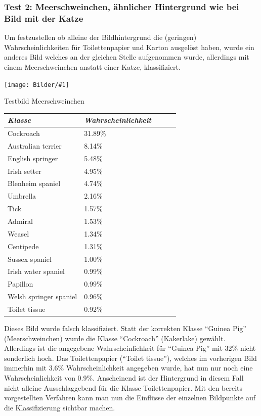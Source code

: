 \documentclass[
  12pt, %
  a4paper, %
  oneside, %
  openany, 
  numbers=noenddot, %
  BCOR=5mm, %
  parskip=half*, %
  thesis, %
]{bfhbook}
\newcommand{\imgText}[3]{
\begin{center}
    \begin{minipage}[t]{0.6\textwidth}
    		\vspace{0pt}
		\texttt{[image: Bilder/\#1]}
		\caption{#2}
	\end{minipage}\hfill
    \begin{minipage}[t]{0.4\textwidth}
    		\vspace{20pt}
  		#3
    \end{minipage}
\end{center}
}
\begin{document}
\subsubsection*{Test 2: Meerschweinchen, ähnlicher Hintergrund wie bei Bild mit der Katze}
Um festzustellen ob alleine der Bildhintergrund die (geringen) Wahrscheinlichkeiten für Toilettenpapier und Karton ausgelöst haben, wurde ein anderes Bild welches an der gleichen Stelle aufgenommen wurde, allerdings mit einem Meerschweinchen anstatt einer Katze, klassifiziert.
\imgText{IMG_2729.JPG}{Testbild Meerschweinchen}{

		\begin{tabular}{@{} *5l @{}}    \toprule
		\emph{Klasse} & \emph{Wahrscheinlichkeit} &&&  \\\midrule
		Cockroach & 31.89\% \\
		Australian terrier &  8.14\% \\
		English springer & 5.48\% \\
		Irish setter & 4.95\% \\
		Blenheim spaniel & 4.74\% \\
		Umbrella & 2.16\% \\
		Tick & 1.57\% \\
		Admiral & 1.53\% \\
		Weasel  & 1.34\% \\
		Centipede & 1.31\% \\
		Sussex spaniel & 1.00\% \\
		Irish water spaniel  & 0.99\% \\
		Papillon & 0.99\% \\
		Welsh springer spaniel  & 0.96\% \\
		Toilet tissue & 0.92\% \\ \bottomrule
		 \hline
		\end{tabular}
}
\break
Dieses Bild wurde falsch klassifiziert. Statt der korrekten Klasse ``Guinea Pig'' (Meerschweinchen) wurde die Klasse ``Cockroach'' (Kakerlake) gewählt. Allerdings ist die angegebene Wahrscheinlichkeit für ``Guinea Pig'' mit 32\% nicht sonderlich hoch. Das Toilettenpapier (``Toilet tissue''), welches im vorherigen Bild immerhin mit 3.6\% Wahrscheinlichkeit angegeben wurde, hat nun nur noch eine Wahrscheinlichkeit von 0.9\%.
\break
Anscheinend ist der Hintergrund in diesem Fall nicht alleine Ausschlaggebend für die Klasse Toilettenpapier. Mit den bereits vorgestellten Verfahren kann man nun die Einflüsse der einzelnen Bildpunkte auf die Klassifizierung sichtbar machen.
\end{document}
